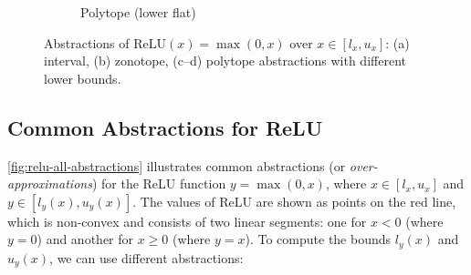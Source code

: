 \documentclass[oneside,11pt,dvipsnames]{book}
\numberwithin{equation}{section}
\theoremstyle{definition}
\theoremstyle{remark}
\begin{document}
\begin{figure}[h]
\begin{subfigure}{0.3\linewidth}
    \end{subfigure}
    \hfill
    \begin{subfigure}{0.3\linewidth}
        \centering
        \caption{Polytope (lower flat)}
        \label{fig:relu-polytope-abstraction}
    \end{subfigure}

    \caption{Abstractions of $\text{ReLU}(x) = \max(0,x)$ over $x \in [l_x, u_x]$: (a) interval, (b) zonotope, (c–d) polytope abstractions with different lower bounds.}
    \label{fig:relu-all-abstractions}
\end{figure}

\subsection{Common Abstractions for ReLU}
\autoref{fig:relu-all-abstractions} illustrates common abstractions (or \emph{over-approximations}) for the ReLU function $y = \max(0, x)$, where $x \in [l_x, u_x]$ and $y \in [l_y(x), u_y(x)]$. The values of ReLU are shown as points on the \colorbox{myred}{red line}, which is non-convex and consists of two linear segments: one for $x < 0$ (where $y = 0$) and another for $x \geq 0$ (where $y = x$).
To compute the bounds $l_y(x)$ and $u_y(x)$, we can use different abstractions: 
\end{document}
